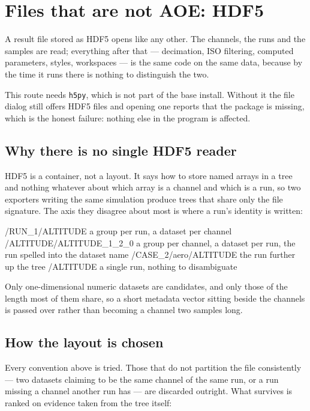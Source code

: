 \documentclass[11pt,a4paper,oneside]{report}
\newcommand{\code}[1]{\texttt{#1}}
\begin{document}
\section{Files that are not AOE: HDF5}
\label{sec:hdf5}

A result file stored as HDF5 opens like any other. The channels, the runs and
the samples are read; everything after that --- decimation, ISO filtering,
computed parameters, styles, workspaces --- is the same code on the same data,
because by the time it runs there is nothing to distinguish the two.

This route needs \code{h5py}, which is not part of the base install. Without it
the file dialog still offers HDF5 files and opening one reports that the package
is missing, which is the honest failure: nothing else in the program is
affected.

\subsection*{Why there is no single HDF5 reader}

HDF5 is a container, not a layout. It says how to store named arrays in a tree
and nothing whatever about which array is a channel and which is a run, so two
exporters writing the same simulation produce trees that share only the file
signature. The axis they disagree about most is where a run's identity is
written:

\begin{aoecode}
/RUN_1/ALTITUDE            a group per run, a dataset per channel
/ALTITUDE/ALTITUDE_1_2_0   a group per channel, a dataset per run, the
                           run spelled into the dataset name
/CASE_2/aero/ALTITUDE      the run further up the tree
/ALTITUDE                  a single run, nothing to disambiguate
\end{aoecode}

Only one-dimensional numeric datasets are candidates, and only those of the
length most of them share, so a short metadata vector sitting beside the
channels is passed over rather than becoming a channel two samples long.

\subsection*{How the layout is chosen}

Every convention above is tried. Those that do not partition the file
consistently --- two datasets claiming to be the same channel of the same run,
or a run missing a channel another run has --- are discarded outright. What
survives is ranked on evidence taken from the tree itself:
\end{document}
